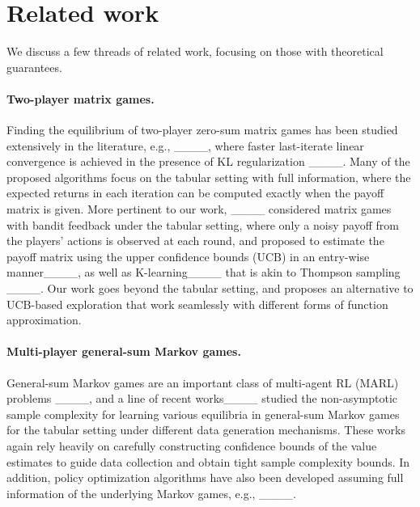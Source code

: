\section{Related work}
\label{sec:related}


We  discuss a few threads of related work, focusing on those with theoretical guarantees. 
 

\paragraph{Two-player matrix games.} Finding the equilibrium of two-player zero-sum matrix games has been studied extensively in the literature, e.g., ____, where faster last-iterate linear convergence is achieved in the presence of KL regularization ____. Many of the proposed algorithms focus on the tabular setting with full information, where the expected returns in each iteration can be computed exactly when the payoff matrix is given. More pertinent to our work, ____ considered matrix games with bandit feedback under the tabular setting, where only a noisy payoff from the players' actions is observed at each round, and proposed to estimate the payoff matrix using the upper confidence bounds (UCB) in an entry-wise manner____, as well as K-learning____ that is akin to Thompson sampling ____. Our work goes beyond the tabular setting, and proposes an alternative to UCB-based exploration that work seamlessly with different forms of function approximation.

 

\paragraph{Multi-player general-sum Markov games.} General-sum Markov games are an important class of multi-agent RL (MARL) problems ____, and a line of recent works____ studied the non-asymptotic sample complexity for learning various equilibria in general-sum Markov games for the tabular setting under different data generation mechanisms. These works again rely heavily on carefully constructing confidence bounds of  the value estimates to guide data collection and obtain tight sample complexity bounds. In addition, policy optimization algorithms have also been developed assuming full information of the underlying Markov games, e.g., ____. 



